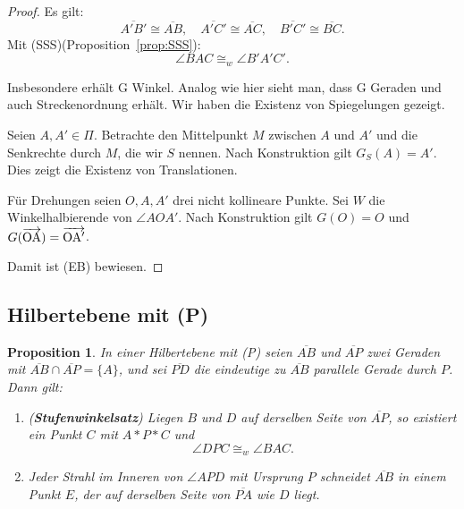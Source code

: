 \documentclass[a4paper,12pt]{article}
\theoremstyle{break}
\newtheorem{proposition}[definition]{Proposition}
\begin{document}
\begin{proof}
Es gilt:
\[
\overline{A'B'} \cong \overline{AB}, \quad \overline{A'C'} \cong \overline{AC}, \quad \overline{B'C'} \cong \overline{BC}.
\]
Mit (SSS)(Proposition~\ref{prop:SSS}):
\[
\angle BAC \cong_w \angle B'A'C'.
\]

Insbesondere erhält G Winkel. Analog wie hier sieht man, dass G Geraden und auch Streckenordnung erhält. Wir haben die Existenz von Spiegelungen gezeigt.

Seien \(A, A' \in \Pi\). Betrachte den Mittelpunkt \(M\) zwischen \(A\) und \(A'\) und die Senkrechte durch \(M\), die wir \(S\) nennen. Nach Konstruktion gilt \(G_S(A) = A'\). Dies zeigt die Existenz von Translationen.  

Für Drehungen seien \(O, A, A'\) drei nicht kollineare Punkte. Sei \(W\) die Winkelhalbierende von \(\angle AOA'\). Nach Konstruktion gilt \(G(O) = O\) und \(G(\overrightarrow{\rm OA}) = \overrightarrow{\rm OA'}\).

Damit ist (EB) bewiesen.
\end{proof}

\begin{center}
\end{center}

\subsection{Hilbertebene mit (P)}

\begin{proposition}\label{prop:stufenwinkelsatz}
In einer Hilbertebene mit (P) seien \(\overline{AB}\) und \(\overline{AP}\) zwei Geraden mit \(\overline{AB} \cap \overline{AP} = \{A\}\), und sei \(\overline{PD}\) die eindeutige zu \(\overline{AB}\) parallele Gerade durch \(P\). Dann gilt:
\begin{enumerate}
    \item (\textbf{Stufenwinkelsatz}) Liegen \(B\) und \(D\) auf derselben Seite von \(\overline{AP}\), so existiert ein Punkt \(C\) mit \(A * P * C\) und 
    \[
    \angle DPC \cong_w \angle BAC.
    \]
    \item Jeder Strahl im Inneren von \(\angle APD\) mit Ursprung \(P\) schneidet \(\overline{AB}\) in einem Punkt \(E\), der auf derselben Seite von \(\overline{PA}\) wie \(D\) liegt.
\end{enumerate}
\end{proposition}
\end{document}
